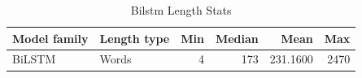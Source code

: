 \begin{table}
\caption{Bilstm Length Stats}
\label{tab:bilstm_length_stats}
\begin{tabular}{llrrrr}
\toprule
Model family & Length type & Min & Median & Mean & Max \\
\midrule
BiLSTM & Words & 4 & 173 & 231.1600 & 2470 \\
\bottomrule
\end{tabular}
\end{table}
